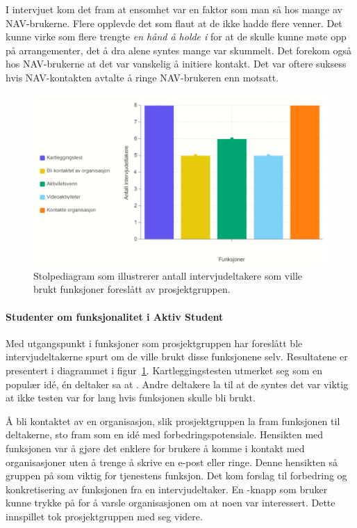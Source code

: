 \vspace{5mm} %

I intervjuet kom det fram at ensomhet var en faktor som man så hos mange av NAV-brukerne. Flere opplevde det som flaut at de ikke hadde flere venner. Det kunne virke som flere trengte {\em en hånd å holde i} for at de skulle kunne møte opp på arrangementer, det å dra alene syntes mange var skummelt. Det forekom også hos NAV-brukerne at det var vanskelig å initiere kontakt. Det var oftere suksess hvis NAV-kontakten avtalte å ringe NAV-brukeren enn motsatt.


\begin{figure}[H]
\includegraphics[width=\textwidth]{Illustrasjoner/diagram-funksjoner.png}
\caption{Stolpediagram som illustrerer antall intervjudeltakere som ville brukt funksjoner foreslått av prosjektgruppen.}
\label{fig:diagram-funksjoner}
\end{figure}

\paragraph{Studenter om funksjonalitet i Aktiv Student}

Med utgangspunkt i funksjoner som prosjektgruppen har foreslått ble intervjudeltakerne spurt om de ville brukt disse funksjonene selv. Resultatene er presentert i diagrammet i figur~\ref{fig:diagram-funksjoner}. Kartleggingstesten utmerket seg som en populær idé, én deltaker sa at . Andre deltakere la til at de syntes det var viktig at ikke testen var for lang hvis funksjonen skulle bli brukt.

Å bli kontaktet av en organisasjon, slik prosjektgruppen la fram funksjonen til deltakerne, sto fram som en idé med forbedringspotensiale. Hensikten med funksjonen var å gjøre det enklere for brukere å komme i kontakt med organisasjoner uten å trenge å skrive en e-post eller ringe. Denne hensikten så gruppen på som viktig for tjenestens funksjon. Det kom forslag til forbedring og konkretisering av funksjonen fra en intervjudeltaker. En -knapp som bruker kunne trykke på for å varsle organisasjonen om at noen var interessert. Dette innspillet tok prosjektgruppen med seg videre.

